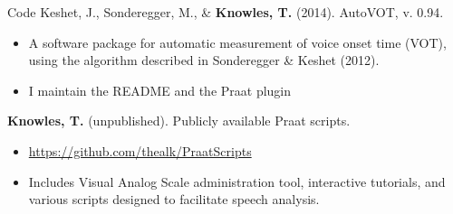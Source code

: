 \documentclass{resume} %
\begin{document}
\begin{rSection}{Code}
	Keshet, J., Sonderegger, M., \& {\bf Knowles, T.} (2014). AutoVOT, v. 0.94.
	\begin{itemize}
			\renewcommand\labelitemi{$\cdot$}
		\item A software package for automatic measurement of voice onset time (VOT), using the algorithm described in Sonderegger \& Keshet (2012).
		\item I maintain the README and the Praat plugin
	\end{itemize}
	
	{\bf Knowles, T.} (unpublished). Publicly available Praat scripts.
	\begin{itemize}
			\renewcommand\labelitemi{$\cdot$}
		\item \url{https://github.com/thealk/PraatScripts}
		\item Includes Visual Analog Scale administration tool, interactive tutorials, and various scripts designed to facilitate speech analysis.
	\end{itemize}
\end{rSection}



\end{document}
